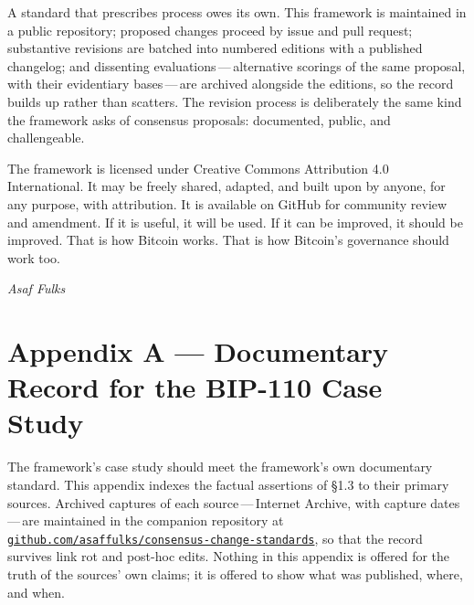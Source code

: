 \documentclass[11pt, twoside, openright]{book}
\newcommand{\sect}[1]{\S#1}
\begin{document}
A standard that prescribes process owes its own. This framework is maintained in a public repository; proposed changes proceed by issue and pull request; substantive revisions are batched into numbered editions with a published changelog; and dissenting evaluations\,---\,alternative scorings of the same proposal, with their evidentiary bases\,---\,are archived alongside the editions, so the record builds up rather than scatters. The revision process is deliberately the same kind the framework asks of consensus proposals: documented, public, and challengeable.

The framework is licensed under Creative Commons Attribution 4.0 International. It may be freely shared, adapted, and built upon by anyone, for any purpose, with attribution. It is available on GitHub for community review and amendment. If it is useful, it will be used. If it can be improved, it should be improved. That is how Bitcoin works. That is how Bitcoin's governance should work too.

\vspace{2em}

\begin{flushright}
\textit{Asaf Fulks}
\end{flushright}

\backmatter

\chapter{Appendix A --- Documentary Record for the BIP-110 Case Study}

The framework's case study should meet the framework's own documentary standard. This appendix indexes the factual assertions of \sect{1.3} to their primary sources. Archived captures of each source\,---\,Internet Archive, with capture dates\,---\,are maintained in the companion repository at \href{https://github.com/asaffulks/consensus-change-standards}{\nolinkurl{github.com/asaffulks/consensus-change-standards}}, so that the record survives link rot and post-hoc edits. Nothing in this appendix is offered for the truth of the sources' own claims; it is offered to show what was published, where, and when.
\end{document}
